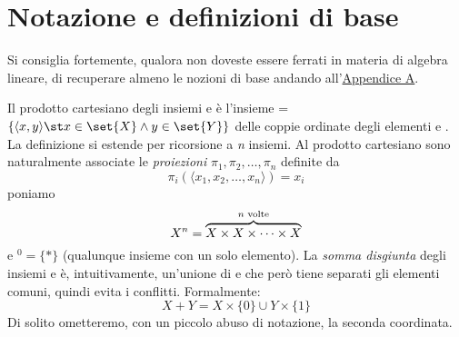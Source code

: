 \chapter{Notazione e definizioni di base}
Si consiglia fortemente, qualora non doveste essere ferrati in materia di algebra lineare, di recuperare almeno le nozioni di base andando all'\hyperref[sec:algebra]{Appendice A}.

Il prodotto cartesiano degli insiemi  e  è l'insieme  = $\{\langle x, y \rangle \st x \in \set{X} \land y \in \set{Y}\}$ delle coppie ordinate degli elementi  e . La definizione si estende per ricorsione a \textit{n} insiemi. Al prodotto cartesiano  sono naturalmente associate le \textit{proiezioni} $\pi_1, \pi_2, \dots, \pi_n$ definite da
\begin{equation}
    \pi_i(\langle x_1, x_2, \dots, x_n \rangle) = x_i
\end{equation}
poniamo
\begin{equation}
    X^n = \overbrace{X \times X \times \dots \times X}^{\textnormal{$n$ volte}}
\end{equation}
e $^0 = \{*\}$ (qualunque insieme con un solo elemento). La \textit{somma disgiunta} degli insiemi  e  è, intuitivamente, un'unione di  e  che però tiene separati gli elementi comuni, quindi evita i conflitti. Formalmente:
\begin{equation}
    X + Y = X \times \{0\} \cup Y \times \{1\}
\end{equation}
Di solito ometteremo, con un piccolo abuso di notazione, la seconda coordinata.
